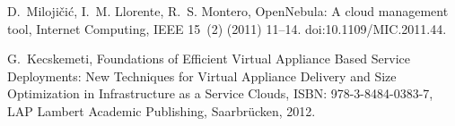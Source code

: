 \documentclass[sort, compress, 5p]{elsarticle}
\begin{document}
\begin{thebibliography}{10}
D.~Miloji{\v{c}}i{\'c}, I.~M. Llorente, R.~S. Montero, {OpenNebula}: {A} cloud
  management tool, Internet Computing, IEEE 15~(2) (2011) 11--14.
\newblock doi:10.1109/MIC.2011.44.

G.~Kecskemeti, Foundations of Efficient Virtual Appliance Based Service
  Deployments: New Techniques for Virtual Appliance Delivery and Size
  Optimization in Infrastructure as a Service Clouds, ISBN: 978-3-8484-0383-7,
  LAP Lambert Academic Publishing, Saarbr{\"u}cken, 2012.

\end{thebibliography}
\end{document}
